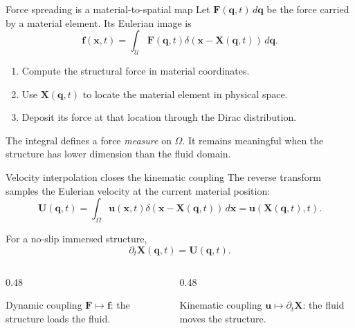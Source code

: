 \documentclass[aspectratio=169,11pt]{beamer}
\newcommand{\xvec}{\bm{x}}
\newcommand{\Xvec}{\bm{q}}
\newcommand{\chivec}{\bm{X}}
\newcommand{\uvec}{\bm{u}}
\newcommand{\Uvec}{\bm{U}}
\newcommand{\fvec}{\bm{f}}
\newcommand{\Fvec}{\bm{F}}
\begin{document}
\begin{frame}{Force spreading is a material-to-spatial map}
Let \(\Fvec(\Xvec,t)\,d\Xvec\) be the force carried by a material element. Its Eulerian image is
\[
  \boxed{
  \fvec(\xvec,t)
  =\int_{\mathcal U}\Fvec(\Xvec,t)
  \delta\!\left(\xvec-\chivec(\Xvec,t)\right)\,d\Xvec .}
\]

\begin{enumerate}\itemsep7pt
  \item Compute the structural force in material coordinates.
  \item Use \(\chivec(\Xvec,t)\) to locate the material element in physical space.
  \item Deposit its force at that location through the Dirac distribution.
\end{enumerate}

\begin{punchbox}
The integral defines a force \emph{measure} on \(\Omega\). It remains meaningful when the structure has lower dimension than the fluid domain.
\end{punchbox}
\end{frame}

\begin{frame}{Velocity interpolation closes the kinematic coupling}
The reverse transform samples the Eulerian velocity at the current material position:
\[
  \Uvec(\Xvec,t)
  =\int_{\Omega}\uvec(\xvec,t)
  \delta\!\left(\xvec-\chivec(\Xvec,t)\right)\,d\xvec
  =\uvec\!\left(\chivec(\Xvec,t),t\right).
\]

For a no-slip immersed structure,
\[
  \boxed{\partial_t\chivec(\Xvec,t)=\Uvec(\Xvec,t).}
\]

\begin{columns}[T,onlytextwidth]
  \begin{column}{0.48\textwidth}
  \begin{block}{Dynamic coupling}
  \(\Fvec\mapsto\fvec\): the structure loads the fluid.
  \end{block}
  \end{column}
  \begin{column}{0.48\textwidth}
  \begin{block}{Kinematic coupling}
  \(\uvec\mapsto\partial_t\chivec\): the fluid moves the structure.
  \end{block}
  \end{column}
\end{columns}
\end{frame}
\end{document}
